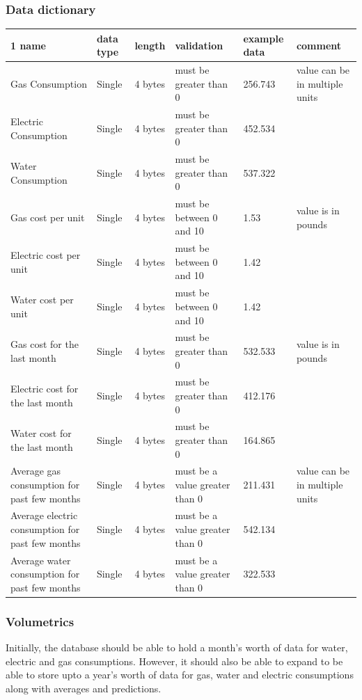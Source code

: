 \subsubsection{Data dictionary}
\begin{center}
\begin{tabular}{|p{3cm}|p{1cm}|p{1.5cm}|p{3cm}|p{2cm}|p{3.5cm}|}
	\hline1
	\textbf{name} & \textbf{data type} & \textbf{length} & \textbf{validation} & \textbf{example data} & \textbf{comment} \\ \hline
	Gas Consumption & Single & 4 bytes & must be greater than 0 & 256.743 & value can be in multiple units \\ \hline
	Electric Consumption & Single & 4 bytes & must be greater than 0 & 452.534 &  \\ \hline
	Water Consumption & Single & 4 bytes & must be greater than 0 & 537.322 &  \\ \hline
	Gas cost per unit & Single & 4 bytes & must be between 0 and 10 & 1.53 & value is in pounds \\ \hline
	Electric cost per unit & Single & 4 bytes & must be between 0 and 10 & 1.42 &  \\ \hline
	Water cost per unit & Single & 4 bytes & must be between 0 and 10 & 1.42 &  \\ \hline
	Gas cost for the last month & Single & 4 bytes & must be greater than 0 & 532.533 & value is in pounds \\ \hline
	Electric cost for the last month & Single & 4 bytes & must be greater than 0 & 412.176 &  \\ \hline
	Water cost for the last month & Single & 4 bytes & must be greater than 0 & 164.865 &  \\ \hline
	Average gas consumption for past few months & Single & 4 bytes & must be a value greater than 0 & 211.431 & value can be in multiple units \\ \hline
	Average electric consumption for past few months & Single & 4 bytes & must be a value greater than 0 & 542.134 &  \\ \hline
	Average water consumption for past few months & Single & 4 bytes & must be a value greater than 0 & 322.533 & \\ \hline
\end{tabular}
\end{center}
\subsubsection{Volumetrics}
Initially, the database should be able to hold a month's worth of data for water, electric and gas consumptions. However, it should also be able to expand to be able to store upto a year's worth of data for gas, water and electric consumptions along with averages and predictions.
